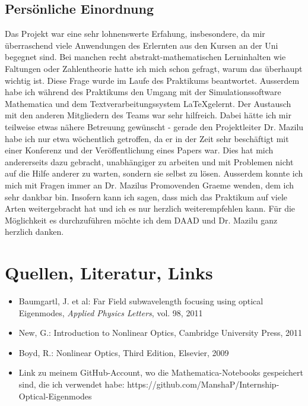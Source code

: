 \documentclass{article}
\begin{document}
\subsection{Pers\"{o}nliche Einordnung}
Das Projekt war eine sehr lohnenswerte Erfahung, insbesondere, da mir \"{u}berraschend viele Anwendungen des Erlernten aus den Kursen an der Uni begegnet sind. Bei manchen recht abstrakt-mathematischen Lerninhalten wie Faltungen oder Zahlentheorie hatte ich mich schon gefragt, warum das \"{u}berhaupt wichtig ist. Diese Frage wurde im Laufe des Praktikums beantwortet. Ausserdem habe ich w\"{a}hrend des Praktikums den Umgang mit der Simulationssoftware Mathematica und dem Textverarbeitungssystem \LaTeX gelernt. Der Austausch mit den anderen Mitgliedern des Teams war sehr hilfreich.  Dabei h\"{a}tte ich mir teilweise etwas n\"{a}here Betreuung gew\"{u}nscht - gerade den Projektleiter Dr. Mazilu habe ich nur etwa w\"{o}chentlich getroffen, da er in der Zeit sehr besch\"{a}ftigt mit einer Konferenz und der Ver\"{o}ffentlichung eines Papers war. Dies hat mich andererseits dazu gebracht, unabh\"{a}ngiger zu arbeiten und mit Problemen nicht auf die Hilfe anderer zu warten, sondern sie selbst zu l\"{o}sen. Ausserdem konnte ich mich mit Fragen immer an Dr. Mazilus Promovenden Graeme wenden, dem ich sehr dankbar bin. Insofern kann ich sagen, dass mich das Praktikum auf viele Arten weitergebracht hat und ich es nur herzlich weiterempfehlen kann. F\"{u}r die M\"{o}glichkeit es durchzuf\"{u}hren m\"{o}chte ich dem DAAD und Dr. Mazilu ganz herzlich danken.
\section{Quellen, Literatur, Links}
\begin{itemize}
  \item Baumgartl, J. et al: Far Field subwavelength focusing using optical Eigenmodes, \emph{Applied Physics Letters}, vol. 98, 2011
  \item New, G.: Introduction to Nonlinear Optics, Cambridge University Press, 2011
  \item Boyd, R.: Nonlinear Optics, Third Edition, Elsevier, 2009
  \item Link zu meinem GitHub-Account, wo die Mathematica-Notebooks gespeichert sind, die ich verwendet habe: https://github.com/ManshaP/Internship-Optical-Eigenmodes
\end{itemize}
\end{document}
